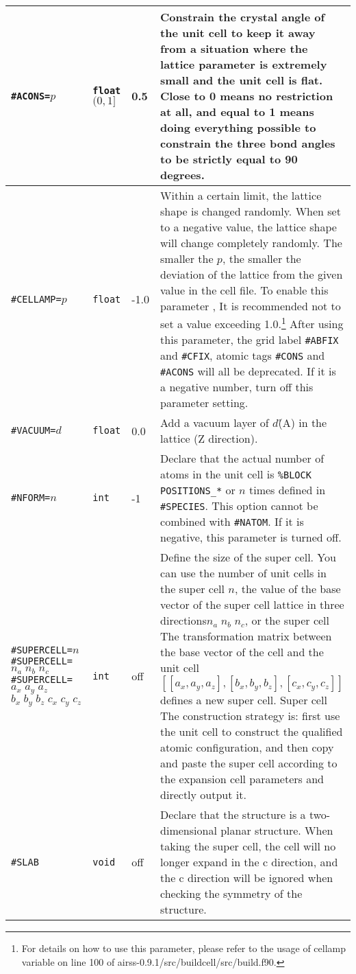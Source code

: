 \documentclass[a4paper, 10pt]{article}
\begin{document}
\begin{center}
\begin{longtable}{m{11em}|m{4em}<{\centering}|m{3em}<{\centering}|m{15em}}
\midrule
\verb|#ACONS=|\(p\)& \verb|float| \((0,1]\) & 0.5 & Constrain the crystal angle of the unit cell to keep it away from a situation where the lattice parameter is extremely small and the unit cell is flat. Close to 0 means no restriction at all, and equal to 1 means doing everything possible to constrain the three bond angles to be strictly equal to 90 degrees.\\
\midrule
\verb|#CELLAMP=|\(p\)& \verb|float| & -1.0 & Within a certain limit, the lattice shape is changed randomly. When set to a negative value, the lattice shape will change completely randomly. The smaller the \(p\), the smaller the deviation of the lattice from the given value in the cell file. To enable this parameter , It is recommended not to set a value exceeding 1.0.\footnote{For details on how to use this parameter, please refer to the usage of cellamp variable on line 100 of airss-0.9.1/src/buildcell/src/build.f90.} After using this parameter, the grid label \verb|#ABFIX| and \verb|#CFIX|, atomic tags \verb|#CONS| and \verb|#ACONS| will all be deprecated. If it is a negative number, turn off this parameter setting.\\
\midrule
\verb|#VACUUM=|\(d\) & \verb|float| & 0.0 & Add a vacuum layer of \(d\)\r(A) in the lattice (Z direction).\\
\midrule
\verb|#NFORM=|\(n\) & \verb|int| & -1 & Declare that the actual number of atoms in the unit cell is \verb|%BLOCK POSITIONS_*| or \(n\) times defined in \verb|#SPECIES|. This option cannot be combined with \verb|#NATOM|. If it is negative, this parameter is turned off.\\
\midrule
\verb|#SUPERCELL=|\(n\) \verb|#SUPERCELL=|\(n_a\;n_b\;n_c\;\;\;\;\;\;\) \hspace{2em}\verb|#SUPERCELL=|\(a_x\; a_y\;a_z\;\)\hspace{2em} \(b_x\;b_y\;b_z\;c_x\;c_y\;c_z\) & \verb|int| & off & Define the size of the super cell. You can use the number of unit cells in the super cell \(n\), the value of the base vector of the super cell lattice in three directions\(n_a\;n_b\;n_c\), or the super cell The transformation matrix between the base vector of the cell and the unit cell \([[a_x,a_y,a_z],[b_x,b_y,b_z],[c_x,c_y,c_z]]\) defines a new super cell. Super cell The construction strategy is: first use the unit cell to construct the qualified atomic configuration, and then copy and paste the super cell according to the expansion cell parameters and directly output it.\\
\midrule
\verb|#SLAB| & \verb|void| & off & Declare that the structure is a two-dimensional planar structure. When taking the super cell, the cell will no longer expand in the c direction, and the c direction will be ignored when checking the symmetry of the structure.\\

\end{longtable}
\end{center}
\end{document}
